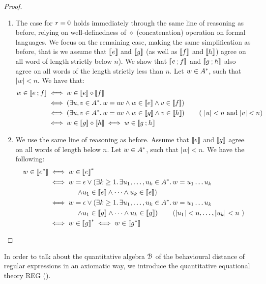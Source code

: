 \begin{proof}
\begin{enumerate}
    \item The case for $r = 0$ holds immediately through the same line of reasoning as before, relying on well-definedness of $\diamond$ (concatenation) operation on formal languages. We focus on the remaining case, making the same simplification as before, that is we assume that $\left\llbracket{e}\right\rrbracket$ and $\left\llbracket{g}\right\rrbracket$ (as well as $\left\llbracket{f}\right\rrbracket$ and $\left\llbracket{h}\right\rrbracket$) agree on all word of length strictly below $n$). We show that $\left\llbracket{e \mathbin{;}f}\right\rrbracket$ and $\left\llbracket{g \mathbin{;}h}\right\rrbracket$ also agree on all words of the length strictly less than $n$. Let $w \in {A}^{\ast}$, such that $|w|<n$. We have that: 
    \begin{align*}
        w \in \left\llbracket{e \mathbin{;}f}\right\rrbracket &\iff w \in \left\llbracket{e}\right\rrbracket \diamond \left\llbracket{f}\right\rrbracket\\ &\iff
        \left(\exists u,v \in {A}^\ast \ldotp w=uv \wedge w \in \left\llbracket{e}\right\rrbracket \wedge v \in \left\llbracket{f}\right\rrbracket\right)\\
        &\iff  \left(\exists u,v \in {A}^\ast \ldotp w=uv \wedge w \in \left\llbracket{g}\right\rrbracket \wedge v \in \left\llbracket{h}\right\rrbracket\right) \tag{ $|u|< n$ and $|v| < n$} \\
        &\iff w \in \left\llbracket{g}\right\rrbracket \diamond \left\llbracket{h}\right\rrbracket \iff w \in \left\llbracket{g \mathbin{;}h}\right\rrbracket
    \end{align*}
    \item We use the same line of reasoning as before. Assume that $\left\llbracket{e}\right\rrbracket$ and $\left\llbracket{g}\right\rrbracket$ agree on all words of length below $n$. Let $w \in {A}^\ast$, such that $|w| < n$. We have the following:
    \begin{align*}
        w \in \left\llbracket{e^\ast}\right\rrbracket &\iff w \in \left\llbracket{e}\right\rrbracket^\ast\\ 
        &\iff w = \epsilon \vee \left(\exists k \geq 1 \ldotp \exists u_1, \dots, u_k \in {A}^\ast \ldotp w = u_1\dots u_k \right.\\&\left. \qquad\qquad\wedge u_1 \in \left\llbracket{e}\right\rrbracket \wedge \dots \wedge u_k \in \left\llbracket{e}\right\rrbracket\right) \\
        &\iff w = \epsilon \vee \left(\exists k \geq 1 \ldotp \exists u_1, \dots, u_k \in {A}^\ast\ldotp w = u_1\dots u_k \right.\\&\left. \qquad\qquad\wedge u_1 \in \left\llbracket{g}\right\rrbracket \wedge \dots \wedge u_k \in \left\llbracket{g}\right\rrbracket\right) \tag{$|u_1| < n, \dots, |u_k| < n$ }\\
        &\iff w \in \left\llbracket{g}\right\rrbracket^\ast \iff w \in \left\llbracket{g^*}\right\rrbracket
    \end{align*}
\end{enumerate}
\end{proof}
In order to talk about the quantitative algebra $\mathcal{B}$ of the behavioural distance of regular expressions in an axiomatic way, we introduce the quantitative equational theory \textsf{REG} ().

